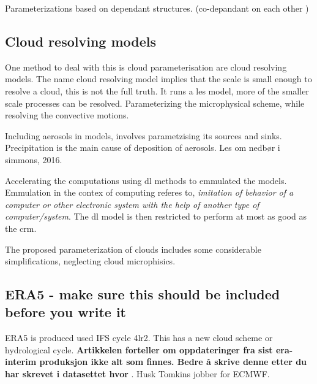 Parameterizations based on dependant structures. (co-depandant on each other )

\subsection{Cloud resolving models} \label{sec:params_climate_models}
One method to deal with this is cloud parameterisation are cloud resolving models. The name cloud resolving model implies that the scale is small enough to resolve a cloud, this is not the full truth. It runs a \acrlong{les} model, more of the smaller scale processes can be resolved. Parameterizing the microphysical scheme, while resolving the convective motions.

Including aerosols in models, involves parametzising its sources and sinks. Precipitation is the main cause of deposition of aerosols. Les om nedbør i simmons, 2016. 

Accelerating the computations using \acrshort{dl} methods to emmulated the models.  Emmulation in the contex of computing referes to, \textit{imitation of behavior of a computer or other electronic system with the help of another type of computer/system}. The \acrshort{dl} model is then restricted to perform at most as good as the \acrshort{crm}.




The proposed parameterization of clouds includes some considerable simplifications, neglecting cloud microphisics. 


\subsection{ERA5 - make sure this should be included before you write it} \label{sec:param_ERA5}
ERA5 is produced used IFS cycle 4lr2. This has a new cloud scheme or hydrological cycle. \textbf{Artikkelen forteller om oppdateringer fra sist era-interim produksjon ikke alt som finnes. Bedre å skrive denne etter du har skrevet i datasettet hvor }. Husk Tomkins jobber for ECMWF.


